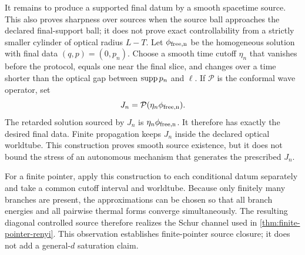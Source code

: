 It remains to produce a supported final datum by a smooth spacetime source.
This also proves sharpness over sources when the source ball approaches the
declared final-support ball; it does not prove exact controllability from a
strictly smaller cylinder of optical radius $L-T$.  Let
$\phi_{\rm free,n}$ be the homogeneous solution with final data
$(q,p)=(0,p_n)$.  Choose a smooth time cutoff $\eta_n$ that vanishes before
the protocol, equals one near the final slice, and changes over a time shorter
than the optical gap between $\operatorname{supp} p_n$ and $\ell$.  If $\mathcal P$ is the
conformal wave operator, set
\begin{equation}
 J_n=\mathcal P(\eta_n\phi_{\rm free,n}).
 \label{eq:smooth-source}
\end{equation}
The retarded solution sourced by $J_n$ is
$\eta_n\phi_{\rm free,n}$.  It therefore has exactly the desired final data.
Finite propagation keeps $J_n$ inside the declared optical worldtube.  This
construction proves smooth source existence, but it does not bound the stress
of an autonomous mechanism that generates the prescribed $J_n$.

For a finite pointer, apply this construction to each conditional datum
separately and take a common cutoff interval and worldtube.  Because only
finitely many branches are present, the approximations can be chosen so that
all branch energies and all pairwise thermal forms converge simultaneously.
The resulting diagonal controlled source therefore realizes the Schur
channel used in \cref{thm:finite-pointer-renyi}.  This observation establishes
finite-pointer source closure; it does not add a general-$d$ saturation claim.

